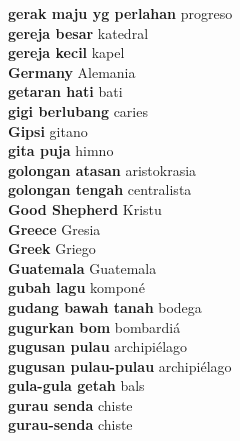 \textbf{ gerak maju yg perlahan  } progreso \\
\textbf{ gereja besar  } katedral \\
\textbf{ gereja kecil  } kapel \\
\textbf{ Germany  } Alemania \\
\textbf{ getaran hati  } bati \\
\textbf{ gigi berlubang  } caries \\
\textbf{ Gipsi  } gitano \\
\textbf{ gita puja  } himno \\
\textbf{ golongan atasan  } aristokrasia \\
\textbf{ golongan tengah  } centralista \\
\textbf{ Good Shepherd  } Kristu \\
\textbf{ Greece  } Gresia \\
\textbf{ Greek  } Griego \\
\textbf{ Guatemala  } Guatemala \\
\textbf{ gubah lagu  } komponé \\
\textbf{ gudang bawah tanah  } bodega \\
\textbf{ gugurkan bom  } bombardiá \\
\textbf{ gugusan pulau  } archipiélago \\
\textbf{ gugusan pulau-pulau  } archipiélago \\
\textbf{ gula-gula getah  } bals \\
\textbf{ gurau senda  } chiste \\
\textbf{ gurau-senda  } chiste \\
